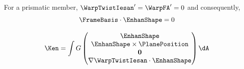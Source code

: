 For a prismatic member, \(\WarpTwistIesan' = \WarpFA' = 0\) and consequently, 
\begin{equation}
    \FrameBasis\cdot \EnhanShape = 0
    \label{eq:enhan-prism}
\end{equation}



\begin{equation*}
\Ken = \int G 
\begin{pmatrix}
    \EnhanShape \\
    \EnhanShape\times \PlanePosition \\
    \mathbf{0} \\
    \nabla \WarpTwistIesan \cdot \EnhanShape
\end{pmatrix}
\dA
\end{equation*}

